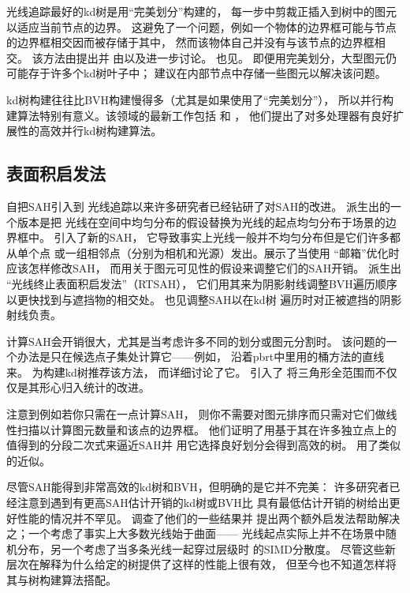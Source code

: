 光线追踪最好的kd树是用“完美划分”构建的，
每一步中剪裁正插入到树中的图元以适应当前节点的边界。
这避免了一个问题，例如一个物体的边界框可能与节点的边界框相交因而被存储于其中，
然而该物体自己并没有与该节点的边界框相交。
该方法由\citet{HavranImproving2002}提出并
由\citet{hurley2002fast}以及\citet{4061547}进一步讨论。
也见\citet{4634623}。
即便用完美划分，大型图元仍可能存于许多个kd树叶子中；
\citet{10.1111/cgf.12241}建议在内部节点中存储一些图元以解决该问题。

kd树构建往往比BVH构建慢得多（尤其是如果使用了“完美划分”），
所以并行构建算法特别有意义。该领域的最新工作包括
\citet{10.1111/j.1467-8659.2007.01062.x}和
\citet{10.5555/1921479.1921492}，
他们提出了对多处理器有良好扩展性的高效并行kd树构建算法。

\subsection{表面积启发法}\label{sub:表面积启发法2}
自\citet{MacDonald1990}把SAH引入到
光线追踪以来许多研究者已经钻研了对SAH的改进。
\citet{10.2312:egs.20091046}派生出的一个版本是把
光线在空间中均匀分布的假设替换为光线的起点均匀分布于场景的边界框中。
\citet{4634614}引入了新的SAH，
它导致事实上光线一般并不均匀分布但是它们许多都从单个点
或一组相邻点（分别为相机和光源）发出。\citet{4634625}展示了当使用
“邮箱”优化时应该怎样修改SAH，
而\citet{VINKLER2012283}用关于图元可见性的假设来调整它们的SAH开销。
\citet{10.1111/j.1467-8659.2011.01861.x}派生出
“光线终止表面积启发法”（RTSAH），
它们用其来为阴影射线调整BVH遍历顺序以更快找到与遮挡物的相交处。
也见\citet{10.2312:sre.20151164}调整SAH以在kd树
遍历时对正被遮挡的阴影射线负责。

计算SAH会开销很大，尤其是当考虑许多不同的划分或图元分割时。
该问题的一个办法是只在候选点子集处计算它——例如，
沿着pbrt中里用的桶方法的直线来。
\citet{hurley2002fast}为构建kd树推荐该方法，
而\citet{4061550}详细讨论了它。
\citet{10.1111/j.1467-8659.2007.01062.x}引入了
将三角形全范围而不仅仅是其形心归入统计的改进。

\citet{4061549}注意到例如若你只需在一点计算SAH，
则你不需要对图元排序而只需对它们做线性扫描以计算图元数量和该点的边界框。
他们证明了用基于其在许多独立点上的值得到的分段二次式来逼近SAH并
用它选择良好划分会得到高效的树。
\citet{4061550}用了类似的近似。

尽管SAH能得到非常高效的kd树和BVH，但明确的是它并不完美：
许多研究者已经注意到遇到有更高SAH估计开销的kd树或BVH比
具有最低估计开销的树给出更好性能的情况并不罕见。
\citet{10.1145/2492045.2492056}调查了他们的一些结果并
提出两个额外启发法帮助解决之；一个考虑了事实上大多数光线始于曲面——
光线起点实际上并不在场景中随机分布，另一个考虑了当多条光线一起穿过层级时
的SIMD分散度。
尽管这些新层次在解释为什么给定的树提供了这样的性能上很有效，
但至今也不知道怎样将其与树构建算法搭配。


